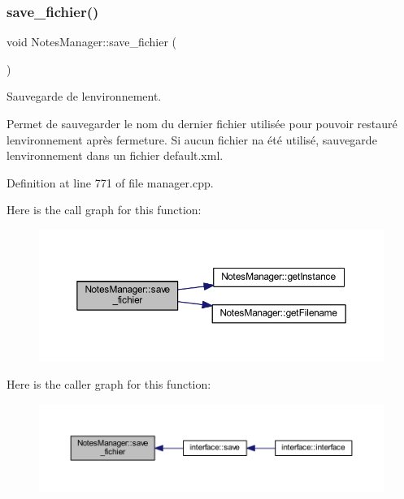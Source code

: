 \subsubsection{\texorpdfstring{save\+\_\+fichier()}{save\_fichier()}}
{\footnotesize\ttfamily void Notes\+Manager\+::save\+\_\+fichier (\begin{DoxyParamCaption}{ }\end{DoxyParamCaption})}



Sauvegarde de l\textquotesingle{}environnement. 

Permet de sauvegarder le nom du dernier fichier utilisée pour pouvoir restauré l\textquotesingle{}environnement après fermeture. Si aucun fichier n\textquotesingle{}a été utilisé, sauvegarde l\textquotesingle{}environnement dans un fichier default.\+xml. 

Definition at line 771 of file manager.\+cpp.

Here is the call graph for this function\+:
\nopagebreak
\begin{figure}[H]
\begin{center}
\leavevmode
\includegraphics[width=350pt]{class_notes_manager_a76c059043681ec4c41d91e75e06ea353_cgraph}
\end{center}
\end{figure}
Here is the caller graph for this function\+:
\nopagebreak
\begin{figure}[H]
\begin{center}
\leavevmode
\includegraphics[width=350pt]{class_notes_manager_a76c059043681ec4c41d91e75e06ea353_icgraph}
\end{center}
\end{figure}
\mbox{\label{class_notes_manager_a797d858176de3f5e64aa8194797909fb}} 
